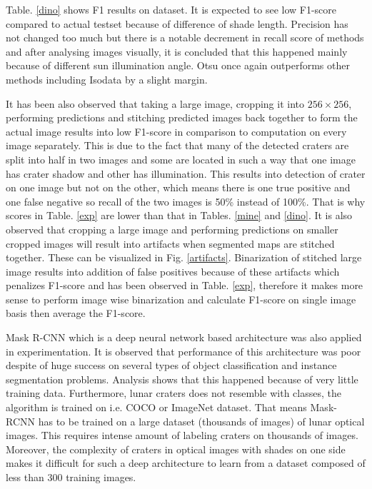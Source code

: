 \documentclass[11pt]{article}
\begin{document}
Table. \ref{dino} shows F1 results on \cite{dino2020} dataset. It is expected to see low F1-score compared to actual testset because of difference of shade length. Precision has not changed too much but there is a notable decrement in recall score of methods and after analysing images visually, it is concluded that this happened mainly because of different sun illumination angle. Otsu once again outperforms other methods including Isodata by a slight margin.

It has been also observed that taking a large image, cropping it into $256 \times 256$, performing predictions and stitching predicted images back together to form the actual image results into low F1-score in comparison to computation on every image separately. This is due to the fact that many of the detected craters are split into half in two images and some are located in such a way that one image has crater shadow and other has illumination. This results into detection of crater on one image but not on the other, which means there is one true positive and one false negative so recall of the two images is 50\% instead of 100\%. That is why scores in Table. \ref{exp} are lower than that in Tables. \ref{mine} and \ref{dino}. It is also observed that cropping a large image and performing predictions on smaller cropped images will result into artifacts when segmented maps are stitched together. These can be visualized in Fig. \ref{artifacts}. Binarization of stitched large image results into addition of false positives because of these artifacts which penalizes F1-score and has been observed in Table. \ref{exp}, therefore it makes more sense to perform image wise binarization and calculate F1-score on single image basis then average the F1-score.

Mask R-CNN which is a deep neural network based architecture was also applied in experimentation. It is observed that performance of this architecture was poor despite of huge success on several types of object classification and instance segmentation problems. Analysis shows that this happened because of very little training data. Furthermore, lunar craters does not resemble with classes, the algorithm is trained on i.e. COCO or ImageNet dataset. That means Mask-RCNN has to be trained on a large dataset (thousands of images) of lunar optical images. This requires intense amount of labeling craters on thousands of images. Moreover, the complexity of craters in optical images with shades on one side makes it difficult for such a deep architecture to learn from a dataset composed of less than 300 training images.
 
\end{document}
